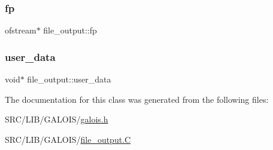 \mbox{\label{classfile__output_ae7ae207b209d10300f3bd748c40dcd42}} 
\subsubsection{\texorpdfstring{fp}{fp}}
{\footnotesize\ttfamily ofstream$\ast$ file\+\_\+output\+::fp}

\mbox{\label{classfile__output_a7337cf9663a3cecb88dd03229a6356a6}} 
\subsubsection{\texorpdfstring{user\+\_\+data}{user\_data}}
{\footnotesize\ttfamily void$\ast$ file\+\_\+output\+::user\+\_\+data}



The documentation for this class was generated from the following files\+:\begin{DoxyCompactItemize}
\item 
S\+R\+C/\+L\+I\+B/\+G\+A\+L\+O\+I\+S/\mbox{\hyperlink{galois_8h}{galois.\+h}}\item 
S\+R\+C/\+L\+I\+B/\+G\+A\+L\+O\+I\+S/\mbox{\hyperlink{file__output_8_c}{file\+\_\+output.\+C}}\end{DoxyCompactItemize}
